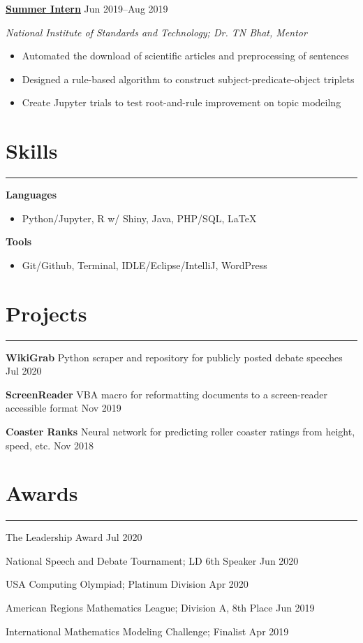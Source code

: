 \documentclass[11pt]{article}
\newcommand{\resumesection}[1]{\vspace{-0.3cm}\section*{\color{highlight}#1}\vspace{-0.3cm}\hrule\vspace{0.3cm}}
\begin{document}
\textbf{\href{https://github.com/petezh/Root-and-Rule-NLP}{Summer Intern}} \hfill Jun 2019--Aug 2019\par
\textit{National Institute of Standards and Technology; Dr. TN Bhat, Mentor}
\begin{itemize}
	\item Automated the download of scientific articles and preprocessing of sentences
	\item Designed a rule-based algorithm to construct subject-predicate-object triplets
	\item Create Jupyter trials to test root-and-rule improvement on topic modeilng
\end{itemize}\vspace{0.1cm}

\resumesection{Skills}


\textbf{Languages}
\begin{itemize} 
	\item Python/Jupyter, R w/ Shiny, Java, PHP/SQL, \LaTeX
\end{itemize}\vspace{0.1cm}


\textbf{Tools}
\begin{itemize} 
	\item Git/Github, Terminal,  IDLE/Eclipse/IntelliJ, WordPress
\end{itemize}


\resumesection{Projects}

\textbf{WikiGrab} Python scraper and repository for publicly posted debate speeches \hfill Jul 2020 \par
\vspace{0.1cm}

\textbf{ScreenReader} VBA macro for reformatting documents to a screen-reader accessible format \hfill Nov 2019 \par
\vspace{0.1cm}

\textbf{Coaster Ranks} Neural network for predicting roller coaster ratings from height, speed, etc.  \hfill Nov 2018\par
\vspace{0.1cm}



\resumesection{Awards}

The Leadership Award \hfill Jul 2020 \par
National Speech and Debate Tournament; LD 6th Speaker \hfill Jun 2020 \par
USA Computing Olympiad; Platinum Division \hfill Apr 2020 \par
American Regions Mathematics League; Division A, 8th Place \hfill Jun 2019 \par
International Mathematics Modeling Challenge; Finalist \hfill Apr 2019\par
\end{document}
